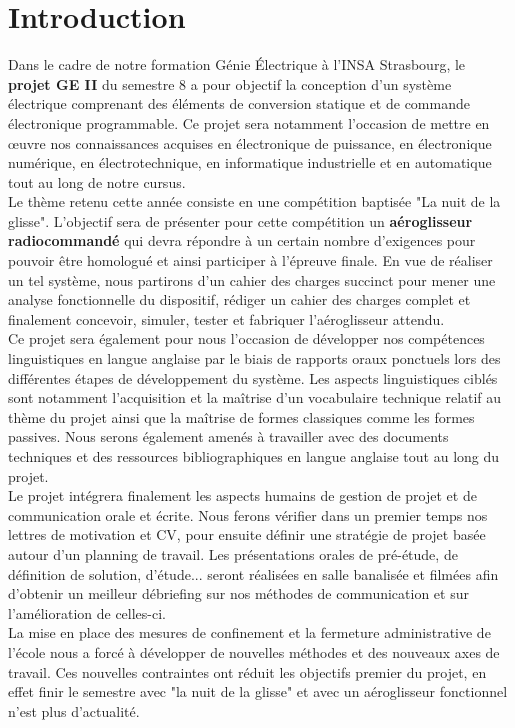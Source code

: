 \chapter{Introduction}
	
	Dans le cadre de notre formation Génie Électrique à l'INSA Strasbourg, le \textbf{projet GE II} du semestre 8 a pour objectif la conception d'un système électrique comprenant des éléments de conversion statique et de commande électronique programmable. Ce projet sera notamment l'occasion de mettre en œuvre nos connaissances acquises en électronique de puissance, en électronique numérique, en électrotechnique, en informatique industrielle et en automatique tout au long de notre cursus. \\
	
	Le thème retenu cette année consiste en une compétition baptisée "La nuit de la glisse". L'objectif sera de présenter pour cette compétition un \textbf{aéroglisseur radiocommandé} qui devra répondre à un certain nombre d'exigences pour pouvoir être homologué et ainsi participer à l'épreuve finale. En vue de réaliser un tel système, nous partirons d'un cahier des charges succinct pour mener une analyse fonctionnelle du dispositif, rédiger un cahier des charges complet et finalement concevoir, simuler, tester et fabriquer l'aéroglisseur attendu.\\
	
	Ce projet sera également pour nous l'occasion de développer nos compétences linguistiques en langue anglaise par le biais de rapports oraux ponctuels lors des différentes étapes de développement du système. Les aspects linguistiques ciblés sont notamment l'acquisition et la maîtrise d'un vocabulaire technique relatif au thème du projet ainsi que la maîtrise de formes classiques comme les formes passives. Nous serons également amenés à travailler avec des documents techniques et des ressources bibliographiques en langue anglaise tout au long du projet.\\
	
	Le projet intégrera finalement les aspects humains de gestion de projet et de communication orale et écrite. Nous ferons vérifier dans un premier temps nos lettres de motivation et CV, pour ensuite définir une stratégie de projet basée autour d'un planning de travail. Les présentations orales de pré-étude, de définition de solution, d'étude... seront réalisées en salle banalisée et filmées afin d'obtenir un meilleur débriefing sur nos méthodes de communication et sur l'amélioration de celles-ci.\\
	
	La mise en place des mesures de confinement et la fermeture administrative de l'école nous a forcé à développer de nouvelles méthodes et des nouveaux axes de travail. Ces nouvelles contraintes ont réduit les objectifs premier du projet, en effet finir le semestre avec "la nuit de la glisse" et avec un aéroglisseur fonctionnel n'est plus d'actualité.